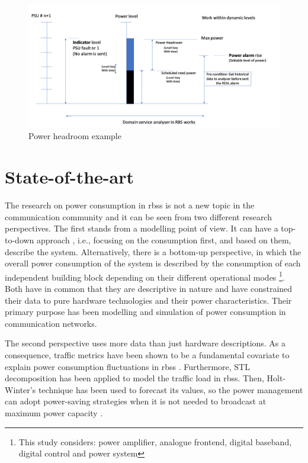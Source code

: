 \begin{figure}[H]
	\centering
	\includegraphics[width=0.95\linewidth]{figures/power_headroom}
	\caption[Power headroom]{Power headroom example}
	\label{fig:powerheadroom} 
\end{figure}



\pagebreak
\section{State-of-the-art}

The research on power consumption in \acp{rbs} is not a new topic in the communication community and it can be seen from two different research perspectives. The first stands from a modelling point of view. It can have a top-to-down approach \cite{power_modeling}, i.e., focusing on the consumption first, and based on them, describe the system. Alternatively, there is a bottom-up perspective, in which the overall power consumption of the system is described by the consumption of each independent building block depending on their different operational modes \cite{power_detailed}\footnote{ This study considers: power amplifier, analogue frontend, digital baseband, digital control and power system}. Both have in common that they are descriptive in nature and have constrained their data to pure hardware technologies and their power characteristics. Their primary purpose has been modelling and simulation of power consumption in communication networks.


The second perspective uses more data than just hardware descriptions. As a consequence, traffic metrics have been shown to be a fundamental covariate to explain power consumption fluctuations in \acp{rbs} \cite{powerregression}. Furthermore, STL decomposition has been applied to model the traffic load in \acp{rbs}. Then, Holt-Winter's technique \cite{winters1960forecasting} has been used to forecast its values, so the power management can adopt power-saving strategies when it is not needed to broadcast at maximum power capacity \cite{piunti40traffic}.


